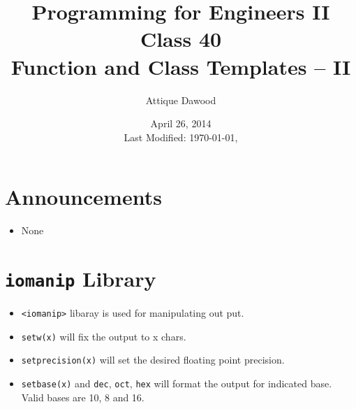 \documentclass[12pt,a4paper]{article}
\title{\vspace{-2cm}Programming for Engineers II\\Class 40\\Function and Class Templates -- II}
\author{Attique Dawood}
\date{April 26, 2014\\[0.2cm] Last Modified: \today, \currenttime}
\begin{document}
\maketitle
\section{Announcements}
\begin{itemize}
\item None
\end{itemize}
\section{\texttt{iomanip} Library}
\begin{itemize}
\item \verb|<iomanip>| libaray is used for manipulating out put.
\item \verb|setw(x)| will fix the output to x chars.
\item \verb|setprecision(x)| will set the desired floating point precision.
\item \verb|setbase(x)| and \verb|dec|, \verb|oct|, \verb|hex| will format the output for indicated base. Valid bases are 10, 8 and 16.
\end{itemize}
\end{document}

